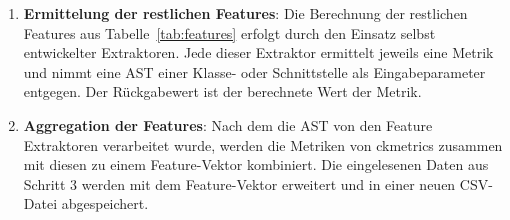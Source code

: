 \begin{enumerate}
    \item \textbf{Ermittelung der restlichen Features}: Die Berechnung der restlichen Features aus Tabelle~\ref{tab:features} erfolgt durch den Einsatz selbst entwickelter Extraktoren. Jede dieser Extraktor ermittelt jeweils eine Metrik und nimmt eine AST einer Klasse- oder Schnittstelle als Eingabeparameter entgegen. Der Rückgabewert ist der berechnete Wert der Metrik.
    \item \textbf{Aggregation der Features}: Nach dem die AST von den Feature Extraktoren verarbeitet wurde, werden die Metriken von ckmetrics zusammen mit diesen zu einem Feature-Vektor kombiniert. Die eingelesenen Daten aus Schritt 3 werden mit dem Feature-Vektor erweitert und in einer neuen CSV-Datei abgespeichert.
\end{enumerate}
 
 